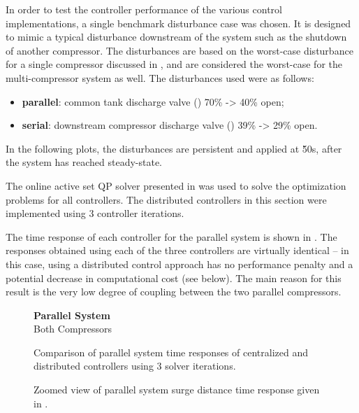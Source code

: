 In order to test the controller performance of the various control implementations, a single benchmark disturbance case was chosen.
It is designed to mimic a typical disturbance downstream of the system such as the shutdown of another compressor.
The disturbances are based on the worst-case disturbance for a single compressor discussed in \cite{Cortinovis2015}, and are considered the worst-case for the multi-compressor system as well.
The disturbances used were as follows:

\begin{itemize}
  \item \textbf{parallel}: common tank discharge valve () 70\% -> 40\% open;
  \item \textbf{serial}: downstream compressor discharge valve () 39\% -> 29\% open.
\end{itemize}
In the following plots, the disturbances are persistent and applied at \u{50}{s}, after the system has reached steady-state.

The online active set QP solver \qpoases{} presented in \cite{Ferreau2014} was used to solve the optimization problems for all controllers.
The distributed controllers in this section were implemented using 3 controller iterations. 

The time response of each controller for the parallel system is shown in .
The responses obtained using each of the three controllers are virtually identical -- in this case, using a distributed control approach has no performance penalty and a potential decrease in computational cost (see below).
The main reason for this result is the very low degree of coupling between the two parallel compressors.


\begin{figure}
  {\centering\small\textbf{Parallel System}\\Both Compressors\\[0.5em]}
  \resizebox{\linewidth}{!}{%
    
  }
  \caption[Time response of parallel system.]{Comparison of parallel system time responses of centralized and distributed controllers using 3 solver iterations.}
  \label{fig:res:parallel-timeresp}
\end{figure}

\begin{figure}
  \centering
  \resizebox{0.5\linewidth}{!}{%
    
  }
  \caption[Zoomed view of surge distance time response of parallel system.]{Zoomed view of parallel system surge distance time response given in .}
  \label{fig:res:parallel-sd-zoom}
\end{figure}

